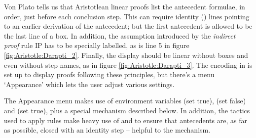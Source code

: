 Von Plato tells us that Aristotlean linear proofs list the antecedent formulae, in order, just before each conclusion step. This can require identity () lines pointing to an earlier derivation of the antecedent; but the first antecedent is allowed to be the last line of a box. In addition, the assumption introduced by the \emph{indirect proof} rule IP has to be specially labelled, as is line 5 in figure \ref{fig:Aristotle:Darapti_2}. Finally, the display should be linear without boxes and even without step names, as in figure \ref{fig:Aristotle:Darapti_3}. The encoding in  is set up to display proofs following these principles, but there's a menu `Appearance' which lets the user adjust various settings.

The Appearance menu makes use of environment variables  (set true),  (set false) and  (set true), plus a special  mechanism described below. In addition, the tactics used to apply rules make heavy use of  and  to ensure that antecedents are, as far as possible, closed with an identity step -- helpful to the  mechanism.


